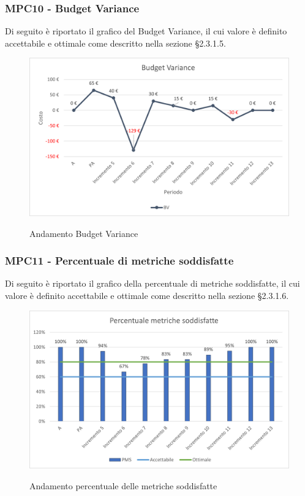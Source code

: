 \subsubsection{MPC10 - Budget Variance}
Di seguito è riportato il grafico del Budget Variance, il cui valore è definito accettabile e ottimale come descritto nella sezione §2.3.1.5.\\

\begin{figure}[H]
\centering
\includegraphics[scale=0.78]{res/ResocontoAttivitaDiVerifica/res/metriche/grafici/img/budgetVariance.png}\\
\caption{Andamento Budget Variance}
\end{figure}


\subsubsection{MPC11 - Percentuale di metriche soddisfatte}
Di seguito è riportato il grafico della percentuale di metriche soddisfatte, il cui valore è definito accettabile e ottimale come descritto nella sezione §2.3.1.6.\\

\begin{figure}[H]
\centering
\includegraphics[scale=0.78]{res/ResocontoAttivitaDiVerifica/res/metriche/grafici/img/metricheSoddisfatte.png}\\
\caption{Andamento percentuale delle metriche soddisfatte}
\end{figure}


